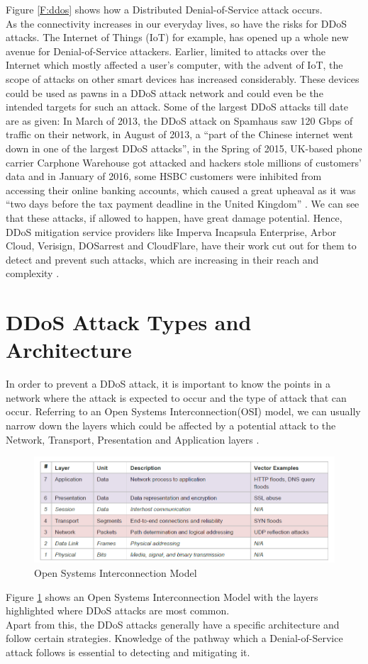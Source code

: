 Figure \ref{F:ddos} shows how a Distributed Denial-of-Service attack occurs.\\
As the connectivity increases in our everyday lives, so have the risks for DDoS attacks. The Internet of Things (IoT) for example, has opened up a whole new avenue for Denial-of-Service attackers. Earlier, limited to attacks over the Internet which mostly affected a user's computer, with the advent of IoT, the scope of attacks on other smart devices has increased considerably. These devices could be used as pawns in a DDoS attack network and could even be the intended targets for such an attack. Some of the largest DDoS attacks till date are as given: In March of 2013, the DDoS attack on Spamhaus saw 120 Gbps of traffic on their network, in August of 2013, a ``part of the Chinese internet went down in one of the largest DDoS attacks'', in the Spring of 2015, UK-based phone carrier Carphone Warehouse got attacked and hackers stole millions of customers’ data and in January of 2016, some HSBC customers were inhibited from accessing their online banking accounts, which caused a great upheaval as it was ``two days before the tax payment deadline in the United Kingdom'' \cite{lea03}. We can see that these attacks, if allowed to happen, have great damage potential. Hence, DDoS mitigation service providers like Imperva Incapsula Enterprise, Arbor Cloud, Verisign, DOSarrest and CloudFlare, have their work cut out for them to detect and prevent such attacks, which are increasing in their reach and complexity \cite{jess04}.
   

\section{DDoS Attack Types and Architecture}
In order to prevent a DDoS attack, it is important to know the points in a network where the attack is expected to occur and the type of attack that can occur. Referring to an Open Systems Interconnection(OSI) model, we can usually narrow down the layers which could be affected by a potential attack to the Network, Transport, Presentation and Application layers \cite{amazon02}.
\begin{figure}
	\includegraphics[width=1.0\columnwidth]{images/OSI.PNG}
	\caption{Open Systems Interconnection Model \cite{amazon02}}
	\label{F:osi}
\end{figure}
Figure \ref{F:osi} shows an Open Systems Interconnection Model with the layers highlighted where DDoS attacks are most common.\\
Apart from this, the DDoS attacks generally have a specific architecture and follow certain strategies. Knowledge of the pathway which a Denial-of-Service attack follows is essential to detecting and mitigating it.
